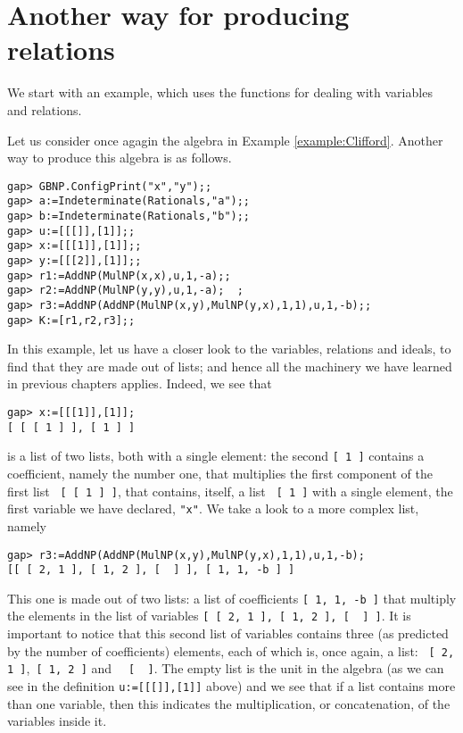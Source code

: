 \section{Another way for producing relations}

We start with an example, which uses the functions for dealing with variables and relations.
\begin{example}\label{example:Clifford_revisited}
Let us consider once agagin the algebra in Example 	\ref{example:Clifford}. Another way to produce this algebra is as follows.
\begin{lstlisting}
gap> GBNP.ConfigPrint("x","y");;
gap> a:=Indeterminate(Rationals,"a");;
gap> b:=Indeterminate(Rationals,"b");;
gap> u:=[[[]],[1]];;
gap> x:=[[[1]],[1]];;
gap> y:=[[[2]],[1]];;
gap> r1:=AddNP(MulNP(x,x),u,1,-a);;
gap> r2:=AddNP(MulNP(y,y),u,1,-a);  ;                    
gap> r3:=AddNP(AddNP(MulNP(x,y),MulNP(y,x),1,1),u,1,-b);;
gap> K:=[r1,r2,r3];;
\end{lstlisting}
In this example, let us have a closer look to the variables, relations and ideals, to find that they are made out of lists; and hence all the machinery we have learned in previous chapters applies. Indeed, we see that
\begin{lstlisting}
gap> x:=[[[1]],[1]];
[ [ [ 1 ] ], [ 1 ] ]
\end{lstlisting}
is a list of two lists, both with a single element: the second \lstinline{[ 1 ]} contains a coefficient, namely the number one, that multiplies the first component of the first list \lstinline{ [ [ 1 ] ]}, that contains, itself, a list \lstinline{ [ 1 ]} with a single element, the first variable we have declared, \lstinline{"x"}. We take a look to a more complex list, namely
\begin{lstlisting}
gap> r3:=AddNP(AddNP(MulNP(x,y),MulNP(y,x),1,1),u,1,-b);
[[ [ 2, 1 ], [ 1, 2 ], [  ] ], [ 1, 1, -b ] ]
\end{lstlisting}
This one is made out of two lists: a list of coefficients \lstinline{[ 1, 1, -b ]} that multiply the elements in the list of variables \lstinline{[ [ 2, 1 ], [ 1, 2 ], [  ] ]}. It is important to notice that this second list of variables contains three (as predicted by the number of coefficients) elements, each of which is, once again, a list: \lstinline{ [ 2, 1 ]},\lstinline{ [ 1, 2 ]} and  \lstinline{  [  ]}. The empty list is the unit in the algebra (as we can see in the definition  \lstinline{u:=[[[]],[1]]} above) and we see that if a list contains more than one variable, then this indicates the multiplication, or concatenation, of the variables inside it.


\end{example}
